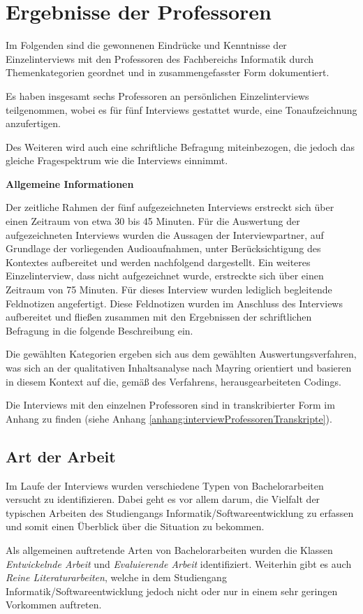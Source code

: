 \documentclass[bibliography=totoc,listof=totoc,BCOR=5mm,DIV=12,oneside]{scrbook}
\begin{document}
\section{Ergebnisse der Professoren}
\par Im Folgenden sind die gewonnenen Eindrücke und Kenntnisse der Einzelinterviews mit den Professoren des Fachbereichs Informatik durch Themenkategorien geordnet und in zusammengefasster Form dokumentiert.
\par Es haben insgesamt sechs Professoren an persönlichen Einzelinterviews teilgenommen, wobei es für fünf Interviews gestattet wurde, eine Tonaufzeichnung anzufertigen.
\par\medskip Des Weiteren wird auch eine schriftliche Befragung miteinbezogen, die jedoch das gleiche Fragespektrum wie die Interviews einnimmt.
\par\bigskip \textbf{Allgemeine Informationen}
\par Der zeitliche Rahmen der fünf aufgezeichneten Interviews erstreckt sich über einen Zeitraum von etwa 30 bis 45 Minuten. Für die Auswertung der aufgezeichneten Interviews wurden die Aussagen der Interviewpartner, auf Grundlage der vorliegenden Audioaufnahmen, unter Berücksichtigung des Kontextes aufbereitet und werden nachfolgend dargestellt. Ein weiteres Einzelinterview, dass nicht aufgezeichnet wurde, erstreckte sich über einen Zeitraum von 75 Minuten. Für dieses Interview wurden lediglich begleitende Feldnotizen angefertigt. Diese Feldnotizen wurden im Anschluss des Interviews aufbereitet und fließen zusammen mit den Ergebnissen der schriftlichen Befragung in die folgende Beschreibung ein.
\par\medskip Die gewählten Kategorien ergeben sich aus dem gewählten Auswertungsverfahren, was sich an der qualitativen Inhaltsanalyse nach Mayring\citep{Mayring2015} orientiert und basieren in diesem Kontext auf die, gemäß des Verfahrens, herausgearbeiteten Codings.

\par \bigskip Die Interviews mit den einzelnen Professoren sind in transkribierter Form im Anhang zu finden (siehe Anhang \ref{anhang:interviewProfessorenTranskripte}).

\newpage
\subsection{Art der Arbeit}
\par Im Laufe der Interviews wurden verschiedene Typen von Bachelorarbeiten versucht zu identifizieren. Dabei geht es vor allem darum, die Vielfalt der typischen Arbeiten des Studiengangs Informatik/Softwareentwicklung zu erfassen und somit einen Überblick über die Situation zu bekommen.
\par \medskip Als allgemeinen auftretende Arten von Bachelorarbeiten wurden die Klassen \textit{Entwickelnde Arbeit}  und \textit{Evaluierende Arbeit} identifiziert. Weiterhin gibt es auch \textit{Reine Literaturarbeiten}, welche in dem Studiengang Informatik/Softwareentwicklung jedoch nicht oder nur in einem sehr geringen Vorkommen auftreten.
\end{document}
